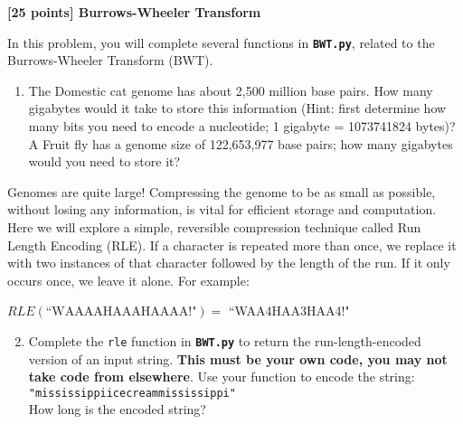 {\bf [25 points] Burrows-Wheeler Transform}\\

\vspace{0.1in}

In this problem, you will complete several functions in \textbf{\texttt{BWT.py}}, related to the Burrows-Wheeler Transform (BWT).

\begin{enumerate}
    \item The Domestic cat genome has about 2,500 million base pairs. How many gigabytes would it take to store this information (Hint: first determine how many bits you need to encode a nucleotide; 1 gigabyte = 1073741824 bytes)? A Fruit fly has a genome size of 122,653,977 base pairs; how many gigabytes would you need to store it?
\end{enumerate}

\begin{solution}
 
\end{solution}

Genomes are quite large! Compressing the genome to be as small as possible, without losing any information, is vital for efficient storage and computation. Here we will explore a simple, reversible compression technique called Run Length Encoding (RLE). If a character is repeated more than once, we replace it with two instances of that character followed by the length of the run. If it only occurs once, we leave it alone. For example:

{
\begin{center}
    $RLE(\textrm{``WAAAAHAAAHAAAA!"}) = $ ``WAA4HAA3HAA4!"
\end{center}
}

\begin{enumerate}
  \setcounter{enumii}{1}
  \item \label{scottytartan} Complete the \texttt{rle} function in \textbf{\texttt{BWT.py}} to return the run-length-encoded version of an input string. \textbf{This must be your own code, you may not take code from elsewhere}. Use your function to encode the string:\\
  \texttt{"mississippiicecreammississippi"}\\How long is the encoded string?
\end{enumerate}

\begin{solution}
\end{solution}

